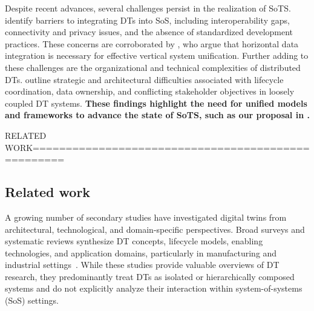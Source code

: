 Despite recent advances, several challenges persist in the realization of SoTS. \textcite{michael2022integration} identify barriers to integrating DTs into SoS, including interoperability gaps, connectivity and privacy issues, and the absence of standardized development practices. These concerns are corroborated by \textcite{semeraro2021digital}, who argue that horizontal data integration is necessary for effective vertical system unification. Further adding to these challenges are the organizational and technical complexities of distributed DTs. \textcite{borth2019digital} outline strategic and architectural difficulties associated with lifecycle coordination, data ownership, and conflicting stakeholder objectives in loosely coupled DT systems. \textbf{These findings highlight the need for unified models and frameworks to advance the state of SoTS, such as our proposal in .}






RELATED WORK===================================================
\subsection{Related work}\label{sec:relatedwork}

A growing number of secondary studies have investigated digital twins from architectural, technological, and domain-specific perspectives. Broad surveys and systematic reviews synthesize DT concepts, lifecycle models, enabling technologies, and application domains, particularly in manufacturing and industrial settings~\cite{tao2018digital, kritzinger2018digital, fuller2020digital, liu2021review, barricelli2019survey}. While these studies provide valuable overviews of DT research, they predominantly treat DTs as isolated or hierarchically composed systems and do not explicitly analyze their interaction within system-of-systems (SoS) settings.

